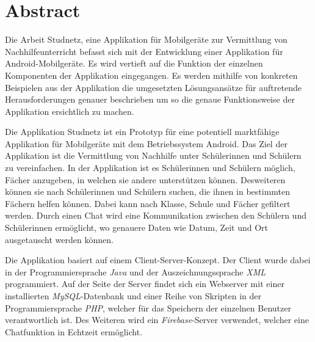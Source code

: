 \documentclass[../main.tex]{subfiles}
\begin{document}
\chapter*{Abstract}
	Die Arbeit \glqq Studnetz, eine Applikation für Mobilgeräte zur Vermittlung von Nachhilfeunterricht\grqq{}  befasst sich mit der Entwicklung einer Applikation für Android-Mobilgeräte. Es wird vertieft auf die Funktion der einzelnen Komponenten der Applikation eingegangen. Es werden mithilfe von konkreten Beispielen aus der Applikation die umgesetzten Lösungsansätze für auftretende Herausforderungen genauer beschrieben um so die genaue Funktionsweise der Applikation ersichtlich zu machen.
	
	Die Applikation \glqq Studnetz\grqq{} ist ein Prototyp für eine potentiell marktfähige Applikation für Mobilgeräte mit dem Betriebssystem Android. Das Ziel der Applikation ist die Vermittlung von Nachhilfe unter Schülerinnen und Schülern zu vereinfachen. In der Applikation ist es Schülerinnen und Schülern möglich, Fächer anzugeben, in welchen sie andere unterstützen können. Desweiteren können sie nach Schülerinnen und Schülern suchen, die ihnen in bestimmten Fächern helfen können. Dabei kann nach Klasse, Schule und Fächer gefiltert werden. Durch einen Chat wird eine Kommunikation zwischen den Schülern und Schülerinnen ermöglicht, wo genauere Daten wie Datum, Zeit und Ort ausgetauscht werden können.
	
	Die Applikation basiert auf einem Client-Server-Konzept. Der Client wurde dabei in der Programmiersprache \emph{Java} und der Auszeichnungssprache \emph{XML} programmiert. Auf der Seite der Server findet sich ein Webserver mit einer installierten \emph{MySQL}-Datenbank und einer Reihe von Skripten in der Programmiersprache \emph{PHP}, welcher für das Speichern der einzelnen Benutzer verantwortlich ist. Des Weiteren wird ein \emph{Firebase}-Server verwendet, welcher eine Chatfunktion in Echtzeit ermöglicht.
\end{document}
